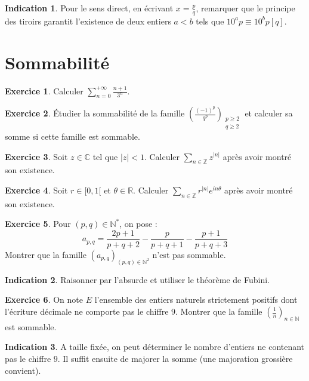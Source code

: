 \documentclass[french]{book}
\newcommand{\N}{\mathbb{N}}
\newcommand{\Z}{\mathbb{Z}}
\newcommand{\R}{\mathbb{R}}
\newcommand{\C}{\mathbb{C}}
\newcommand{\st}{^*}
\theoremstyle{definition}
\newtheorem{ex}{Exercice}[chapter]
\theoremstyle{theorem}
\newtheorem*{ind}{Indication}
\theoremstyle{remark}
\begin{document}
\begin{ind}
	Pour le sens direct, en écrivant $x=\displaystyle\frac{p}{q}$, remarquer que le principe des tiroirs garantit l'existence de deux entiers $a<b$ tels que $10^ap\equiv10^bp[q]$.
\end{ind}

\section{Sommabilité}

\begin{ex}
	Calculer $\displaystyle\sum_{n=0}^{+\infty}\frac{n+1}{3^n}$.
\end{ex}

\begin{ex}
	Étudier la sommabilité de la famille $\displaystyle\left(\frac{(-1)^p}{q^p}\right)_{\substack{p\geqslant 2 \\ q\geqslant 2}}$ et calculer sa somme si cette famille est sommable.
\end{ex}

\begin{ex}
	Soit $z\in\C$ tel que $\lvert z\rvert<1$. Calculer $\displaystyle\sum_{n\in\Z}z^{\lvert n\rvert}$ après avoir montré son existence.
\end{ex}

\begin{ex}
	Soit $r\in[0,1[$ et $\theta\in\R$. Calculer $\displaystyle\sum_{n\in\Z}r^{\lvert n\rvert}e^{in\theta}$ après avoir montré son existence.
\end{ex}

\begin{ex}
	Pour $(p,q)\in\N\st$, on pose : $$a_{p,q}=\frac{2p+1}{p+q+2}-\frac{p}{p+q+1}-\frac{p+1}{p+q+3}$$ Montrer que la famille $(a_{p,q})_{(p,q)\in\N^2}$ n'est pas sommable.
\end{ex}

\begin{ind}
	Raisonner par l'absurde et utiliser le théorème de Fubini.
\end{ind}

\begin{ex}
	On note $E$ l'ensemble des entiers naturels strictement positifs  dont l'écriture décimale ne comporte pas le chiffre $9$. Montrer que la famille $\displaystyle\left(\frac{1}{n}\right)_{n\in\N}$ est sommable.
\end{ex}

\begin{ind}
	A taille fixée, on peut déterminer le nombre d'entiers ne contenant pas le chiffre $9$. Il suffit ensuite de majorer la somme (une majoration grossière convient).
\end{ind}
\end{document}
